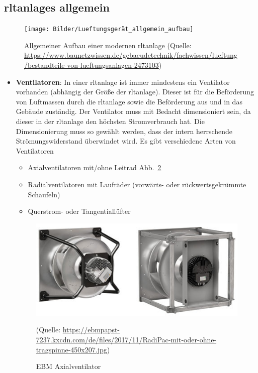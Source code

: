 \subsection{\Acp{rltanlage} allgemein}

\begin{figure}[H]
	\centering
	\texttt{[image: Bilder/Lueftungsgerät\_allgemein\_aufbau]}
	\caption{Allgemeiner Aufbau einer modernen \ac{rltanlage} (Quelle: \url{https://www.baunetzwissen.de/gebaeudetechnik/fachwissen/lueftung/bestandteile-von-lueftungsanlagen-2473103})}
	\label{fig:Aufbau_Lueftungsgerät_allgemein}
\end{figure}

\begin{itemize}
	\item \textbf{Ventilatoren}: In einer \ac{rltanlage} ist immer mindestens ein Ventilator vorhanden (abhängig der Größe der \ac{rltanlage}). Dieser ist für die Beförderung von Luftmassen durch die \ac{rltanlage} sowie die Beförderung aus und in das Gebäude zuständig. Der Ventilator muss mit Bedacht dimensioniert sein, da dieser in der \ac{rltanlage} den höchsten Stromverbrauch hat. Die Dimensionierung muss so gewählt werden, dass der intern herrschende Strömungswiderstand überwindet wird. Es gibt verschiedene Arten von Ventilatoren 
\begin{itemize}
	\item Axialventilatoren mit/ohne Leitrad Abb.~\ref{fig:EBM_Axialventilator}
	\item Radialventilatoren mit Laufräder (vorwärts- oder rückwertsgekrümmte Schaufeln)
	\item Querstrom- oder Tangentiallüfter 
\end{itemize}

\begin{figure}[H]
	\centering
	\includegraphics[width=0.5\linewidth]{Bilder/axialventilator}
	\caption{EBM Axialventilator} 
	(Quelle: \url{https://ebmpapst-7237.kxcdn.com/de/files/2017/11/RadiPac-mit-oder-ohne-tragspinne-450x207.jpg})
	\label{fig:EBM_Axialventilator}
\end{figure}


\end{itemize}
